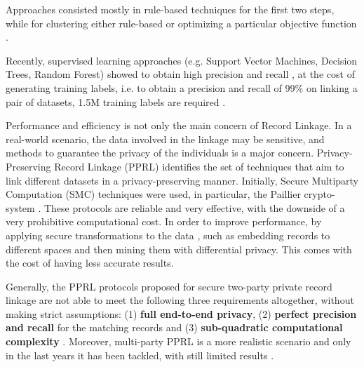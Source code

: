 \documentclass[12pt]{article}
\begin{document}
Approaches consisted mostly in rule-based techniques \cite*{recordLinkTheory, Gal2011} for the first two steps, while for clustering either 
rule-based or optimizing a particular objective function \cite*{Hass2009}. 

Recently, supervised learning approaches (e.g. Support Vector Machines, Decision Trees, Random Forest) showed to obtain high precision and recall \cite*{Das2017}, 
at the cost of generating training labels, i.e. to obtain a precision and recall of 99\% on linking a pair of datasets, 1.5M training labels are required \cite*{Dong2018}.

Performance and efficiency is not only the main concern of Record Linkage. In a real-world scenario, the data involved in the linkage may be sensitive, and methods to guarantee 
the privacy of the individuals is a major concern. Privacy-Preserving Record Linkage (PPRL) identifies the set of techniques that aim to link different datasets in 
a privacy-preserving manner.
Initially, Secure Multiparty Computation (SMC) techniques were used, in particular, the Paillier crypto-system \cite*{paillier1999public}. 
These protocols are reliable and very effective, with the downside of a very prohibitive computational cost. 
In order to improve performance, by applying secure transformations to the data \cite*{Bonomi2013}, such as embedding records to different spaces and then mining them with differential privacy.
This comes with the cost of having less accurate results. 

Generally, the PPRL protocols proposed for secure two-party private record linkage are not able to meet the following three requirements altogether, without making strict assumptions: 
(1) \textbf{full end-to-end privacy}, 
(2) \textbf{perfect precision and recall} for the matching records and (3) \textbf{sub-quadratic computational complexity} \cite*{He2017, Groce2019}. 
Moreover, multi-party PPRL is a more realistic scenario and only in the last years it has been tackled, with still limited results \cite*{Vatsalan2016, Vatsalan2017, Vatsalan2020}.
\end{document}
